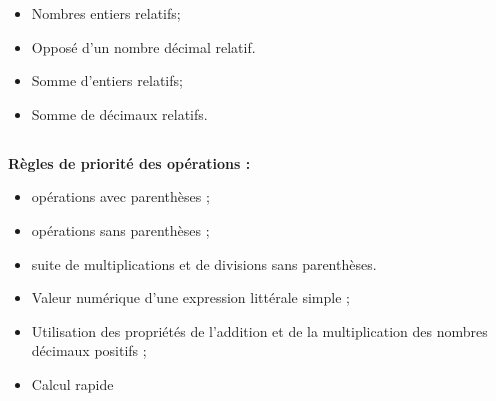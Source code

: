 \savoir
\begin{itemize}
\item Nombres entiers relatifs;
\item Opposé d'un nombre décimal relatif.
\end{itemize}
\savoirfaire
\begin{itemize}
\item Somme d'entiers relatifs;
\item Somme de décimaux relatifs.
\end{itemize}

\subsection*{}

\savoir

\textbf{Règles de priorité des opérations :}
\begin{itemize}
\item opérations avec parenthèses ;
\item opérations sans parenthèses ;
\item suite de multiplications et de divisions sans parenthèses.
\end{itemize}
\savoirfaire
\begin{itemize}
\item Valeur numérique d'une expression littérale simple ;
\item Utilisation des propriétés de l'addition et de la multiplication des nombres décimaux positifs ;
\item Calcul rapide
\end{itemize}